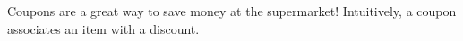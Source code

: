 Coupons are a great way to save money at the supermarket!
Intuitively, a coupon associates
an item with a discount.
